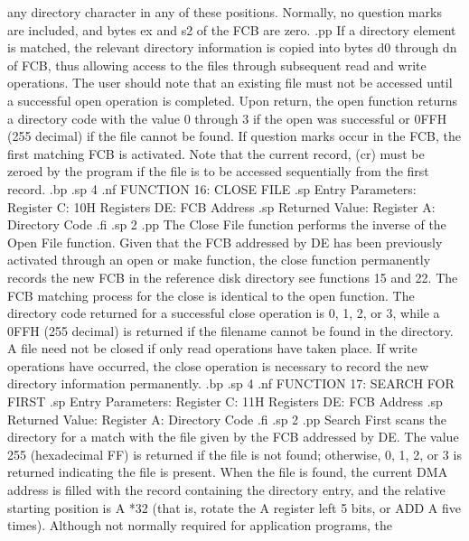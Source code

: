 any directory character in any of these positions.  Normally, no 
question marks are included, and bytes ex and s2 of the FCB are 
zero.
.pp
If a directory element is matched, the relevant directory 
information is copied into bytes d0 through dn of FCB, thus 
allowing access to the files through subsequent read and write 
operations.  The user should note that an existing file must not 
be accessed until a successful open operation is completed.  Upon 
return, the open function returns a directory code with the value 
0 through 3 if the open was successful or 0FFH (255 decimal) if 
the file cannot be found.  If question marks occur in the FCB, 
the first matching FCB is activated.  Note that the current 
record, (cr) must be zeroed by the program if the file is to be 
accessed sequentially from the first record.
.bp
.sp 4
.nf
                    FUNCTION 16:  CLOSE FILE
.sp
             Entry Parameters:  
                   Register C:  10H
                 Registers DE:  FCB Address
.sp
             Returned Value:
                  Register  A:  Directory Code
.fi
.sp 2
.pp
The Close File function performs the inverse of the Open File 
function.  Given that the FCB addressed by DE has been previously 
activated through an open or make function,  the close function 
permanently records the new FCB in the reference disk directory 
see functions 15 and 22.  The FCB matching process for the close 
is identical to the open function.  The directory code returned 
for a successful close operation is 0, 1, 2, or 3, while a 0FFH 
(255 decimal) is returned if the filename cannot be found in the 
directory.  A file need not be closed if only read operations 
have taken place.  If write operations have occurred, the close 
operation is necessary to record the new directory information 
permanently.
.bp
.sp 4
.nf
                    FUNCTION 17:  SEARCH FOR FIRST
.sp
               Entry Parameters:
                     Register C:  11H
                   Registers DE:  FCB Address
.sp
               Returned Value:
                    Register  A:  Directory Code  
.fi
.sp 2
.pp
Search First scans the directory for a match with the file given 
by the FCB addressed by DE.  The value 255 (hexadecimal FF) is 
returned if the file is not found; otherwise, 0, 1, 2, or 3 is 
returned indicating the file is present.  When the file is found, 
the current DMA address is filled with the record containing the 
directory entry, and the relative starting position is A *32 
(that is, rotate the A register left 5 bits, or ADD A five times).  
Although not normally required for application programs, the 
